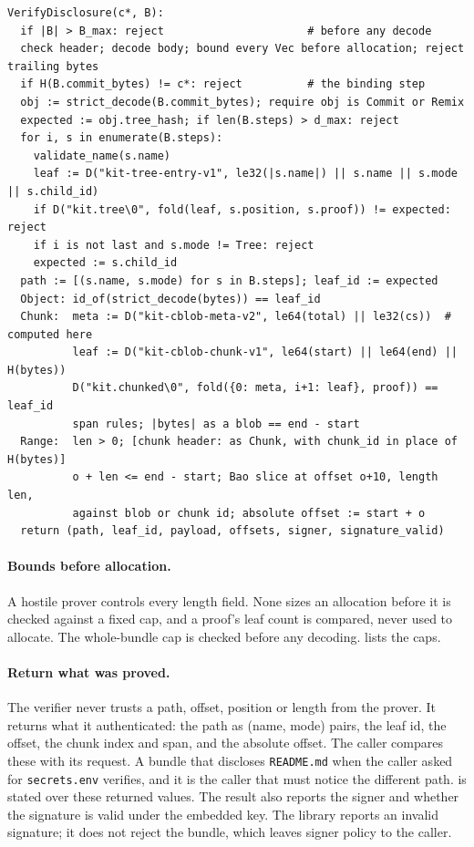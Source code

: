 \documentclass[10pt,letterpaper]{article}
\theoremstyle{remark}
\begin{document}
\begin{algorithm}[!htb]
\caption{Disclosure verification. $B_{\max}$ and $d_{\max}$ are the bundle and
step caps of \cref{tab:bounds}.}\label{alg:disclosure}
\begin{lstlisting}[style=kitalgo]
VerifyDisclosure(c*, B):
  if |B| > B_max: reject                      # before any decode
  check header; decode body; bound every Vec before allocation; reject trailing bytes
  if H(B.commit_bytes) != c*: reject          # the binding step
  obj := strict_decode(B.commit_bytes); require obj is Commit or Remix
  expected := obj.tree_hash; if len(B.steps) > d_max: reject
  for i, s in enumerate(B.steps):
    validate_name(s.name)
    leaf := D("kit-tree-entry-v1", le32(|s.name|) || s.name || s.mode || s.child_id)
    if D("kit.tree\0", fold(leaf, s.position, s.proof)) != expected: reject
    if i is not last and s.mode != Tree: reject
    expected := s.child_id
  path := [(s.name, s.mode) for s in B.steps]; leaf_id := expected
  Object: id_of(strict_decode(bytes)) == leaf_id
  Chunk:  meta := D("kit-cblob-meta-v2", le64(total) || le32(cs))  # computed here
          leaf := D("kit-cblob-chunk-v1", le64(start) || le64(end) || H(bytes))
          D("kit.chunked\0", fold({0: meta, i+1: leaf}, proof)) == leaf_id
          span rules; |bytes| as a blob == end - start
  Range:  len > 0; [chunk header: as Chunk, with chunk_id in place of H(bytes)]
          o + len <= end - start; Bao slice at offset o+10, length len,
          against blob or chunk id; absolute offset := start + o
  return (path, leaf_id, payload, offsets, signer, signature_valid)
\end{lstlisting}
\end{algorithm}

\paragraph{Bounds before allocation.}
A hostile prover controls every length field. None sizes an allocation before
it is checked against a fixed cap, and a proof's leaf count is compared, never
used to allocate. The whole-bundle cap is checked before any decoding.
 lists the caps.

\paragraph{Return what was proved.}
The verifier never trusts a path, offset, position or length from the prover.
It returns what it authenticated: the path as (name, mode) pairs, the leaf id,
the offset, the chunk index and span, and the absolute offset. The caller compares these with its request. A bundle
that discloses \texttt{README.md} when the caller asked for
\texttt{secrets.env} verifies, and it is the caller that must notice the
different path.  is stated over these returned values.
The result also reports the signer and whether the signature is valid under
the embedded key. The library reports an invalid signature; it does not reject
the bundle, which leaves signer policy to the caller.
\end{document}

